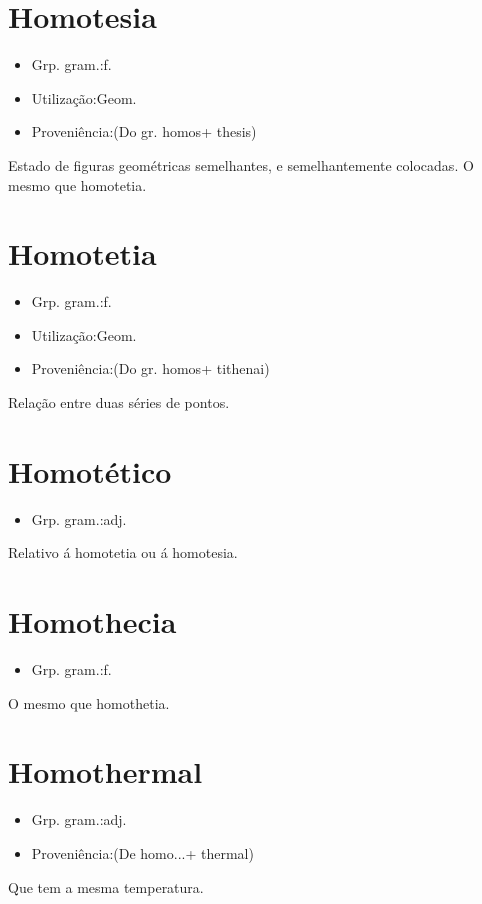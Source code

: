\documentclass{article}
\begin{document}
\section{Homotesia}
\begin{itemize}
\item {Grp. gram.:f.}
\end{itemize}
\begin{itemize}
\item {Utilização:Geom.}
\end{itemize}
\begin{itemize}
\item {Proveniência:(Do gr. \textunderscore homos\textunderscore  + \textunderscore thesis\textunderscore )}
\end{itemize}
Estado de figuras geométricas semelhantes, e semelhantemente colocadas.
O mesmo que \textunderscore homotetia\textunderscore .
\section{Homotetia}
\begin{itemize}
\item {Grp. gram.:f.}
\end{itemize}
\begin{itemize}
\item {Utilização:Geom.}
\end{itemize}
\begin{itemize}
\item {Proveniência:(Do gr. \textunderscore homos\textunderscore  + \textunderscore tithenai\textunderscore )}
\end{itemize}
Relação entre duas séries de pontos.
\section{Homotético}
\begin{itemize}
\item {Grp. gram.:adj.}
\end{itemize}
Relativo á homotetia ou á homotesia.
\section{Homothecia}
\begin{itemize}
\item {Grp. gram.:f.}
\end{itemize}
O mesmo que \textunderscore homothetia\textunderscore .
\section{Homothermal}
\begin{itemize}
\item {Grp. gram.:adj.}
\end{itemize}
\begin{itemize}
\item {Proveniência:(De \textunderscore homo...\textunderscore  + \textunderscore thermal\textunderscore )}
\end{itemize}
Que tem a mesma temperatura.
\end{document}
